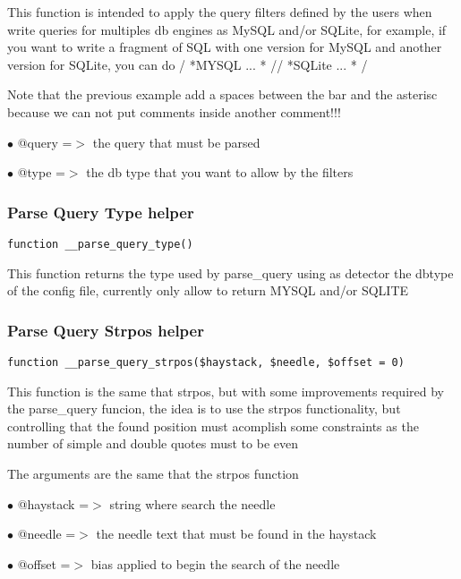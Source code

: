 \documentclass[a4paper]{article}
\begin{document}
This function is intended to apply the query filters defined by the users
when write queries for multiples db engines as MySQL and/or SQLite, for
example, if you want to write a fragment of SQL with one version for MySQL
and another version for SQLite, you can do / *MYSQL ... * // *SQLite ... * /

Note that the previous example add a spaces between the bar and the asterisc
because we can not put comments inside another comment!!!

\begin{compactitem}
\item[\color{myblue}$\bullet$] @query =$>$ the query that must be parsed
\item[\color{myblue}$\bullet$] @type  =$>$ the db type that you want to allow by the filters
\end{compactitem}

\hypertarget{toc215}{}
\subsubsection{Parse Query Type helper}

\begin{lstlisting}
function __parse_query_type()
\end{lstlisting}

This function returns the type used by parse\_query using as detector the
dbtype of the config file, currently only allow to return MYSQL and/or SQLITE

\hypertarget{toc216}{}
\subsubsection{Parse Query Strpos helper}

\begin{lstlisting}
function __parse_query_strpos($haystack, $needle, $offset = 0)
\end{lstlisting}

This function is the same that strpos, but with some improvements required
by the parse\_query funcion, the idea is to use the strpos functionality, but
controlling that the found position must acomplish some constraints as the
number of simple and double quotes must to be even

The arguments are the same that the strpos function

\begin{compactitem}
\item[\color{myblue}$\bullet$] @haystack =$>$ string where search the needle
\item[\color{myblue}$\bullet$] @needle   =$>$ the needle text that must be found in the haystack
\item[\color{myblue}$\bullet$] @offset   =$>$ bias applied to begin the search of the needle
\end{compactitem}
\end{document}
